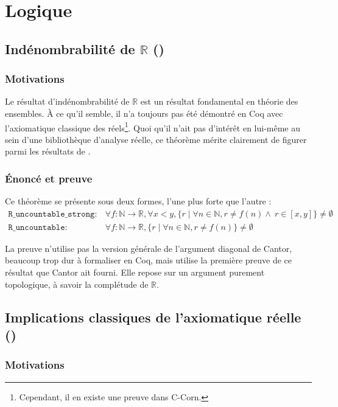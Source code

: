 \section{Logique}

\subsection{Indénombrabilité de $\mathbb{R}$ ()}

\subsubsection{Motivations}

Le résultat d'indénombrabilité de $\mathbb{R}$ est un résultat fondamental en théorie des ensembles. À ce qu'il semble, il n'a toujours pas été démontré en Coq avec l'axiomatique classique des réels\footnote{Cependant, il en existe une preuve dans C-Corn.}. Quoi qu'il n'ait pas d'intérêt en lui-même au sein d'une bibliothèque d'analyse réelle, ce théorème mérite clairement de figurer parmi les résultats de .

\subsubsection{Énoncé et preuve}

Ce théorème se présente sous deux formes, l'une plus forte que l'autre :
$$\begin{array}{ll}
\mathtt{R\_uncountable\_strong} :& \forall f : \mathbb{N}\rightarrow\mathbb{R}, \forall x < y, \{r\mid\forall n\in\mathbb{N}, r \neq f(n) \wedge\ r\in[x, y]\}\neq\emptyset\\
\mathtt{R\_uncountable} :& \forall f : \mathbb{N}\rightarrow\mathbb{R}, \{r\mid\forall n\in\mathbb{N}, r \neq f(n)\}\neq\emptyset
\end{array}$$

La preuve n'utilise pas la version générale de l'argument diagonal de Cantor, beaucoup trop dur à formaliser en Coq, mais utilise la première preuve de ce résultat que Cantor ait fourni. Elle repose sur un argument purement topologique, à savoir la complétude de $\mathbb{R}$.

\subsection{Implications classiques de l'axiomatique réelle ()}

\subsubsection{Motivations}


